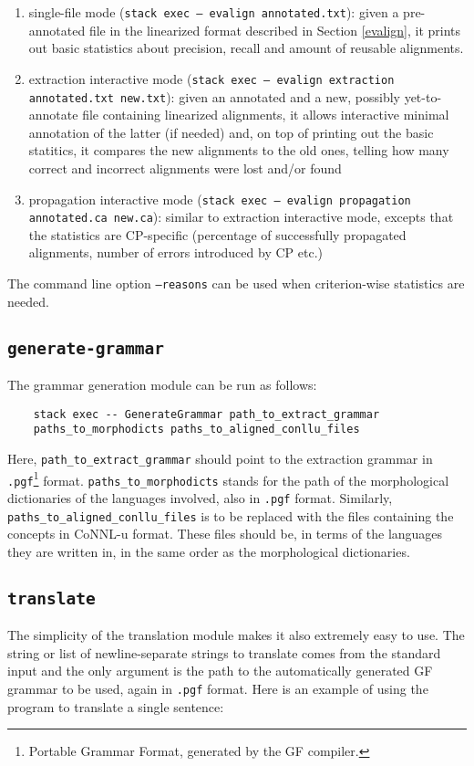 \begin{enumerate}
    \item single-file mode (\texttt{stack exec -- evalign annotated.txt}): given a pre-annotated file in the linearized format described in Section \ref{evalign}, it prints out basic statistics about precision, recall and amount of reusable alignments.
    \item extraction interactive mode (\texttt{stack exec -- evalign extraction annotated.txt new.txt}): given an annotated and a new, possibly yet-to-annotate file containing linearized alignments, it allows interactive minimal annotation of the latter (if needed) and, on top of printing out the basic statitics, it compares the new alignments to the old ones, telling how many correct and incorrect alignments were lost and/or found
    \item propagation interactive mode (\texttt{stack exec -- evalign propagation annotated.ca new.ca}): similar to extraction interactive mode, excepts that the statistics are CP-specific (percentage of successfully propagated alignments, number of errors introduced by CP etc.)
\end{enumerate} \smallskip

The command line option \texttt{--reasons} can be used when criterion-wise statistics are needed.

\subsection{\texttt{generate-grammar}}
The grammar generation module can be run as follows: \smallskip

\begin{verbatim}
    stack exec -- GenerateGrammar path_to_extract_grammar 
    paths_to_morphodicts paths_to_aligned_conllu_files
\end{verbatim} \smallskip

Here, \texttt{path\_to\_extract\_grammar} should point to the extraction grammar in \texttt{.pgf}\footnote{Portable Grammar Format, generated by the GF compiler.} format. \texttt{paths\_to\_morphodicts} stands for the path of the morphological dictionaries of the languages involved, also in \texttt{.pgf} format. Similarly, \texttt{paths\_to\_aligned\_conllu\_files} is to be replaced with the files containing the concepts in CoNNL-u format. These files should be, in terms of the languages they are written in, in the same order as the morphological dictionaries.

\subsection{\texttt{translate}}
The simplicity of the translation module makes it also extremely easy to use. The string or list of newline-separate strings to translate comes from the standard input and the only argument is the path to the automatically generated GF grammar to be used, again in \texttt{.pgf} format. Here is an example of using the program to translate a single sentence: \smallskip

